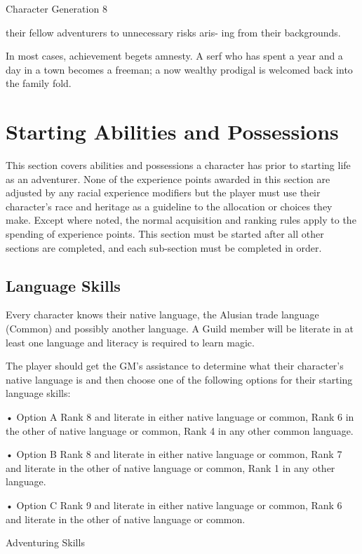 \begin{Chapter}{Character Generation}
8 

their  fellow  adventurers  to  unnecessary  risks  aris-
ing from their backgrounds. 

In most cases, achievement begets amnesty. A serf 
who has spent a year and a day in a town becomes 
a  freeman;  a  now  wealthy  prodigal  is  welcomed 
back into the family fold. 

\section{Starting Abilities and Possessions}

This section covers abilities and possessions a character has prior to
starting life as an adventurer.  None of the experience points awarded
in this section are adjusted by any racial experience modifiers but
the player must use their character’s race and heritage as a guideline
to the allocation or choices they make. Except where noted, the normal
acquisition and ranking rules apply to the spending of experience
points.  This section must be started after all other sections are
completed, and each sub-section must be completed in order.

\subsection{Language Skills}

Every character knows their native language, the Alusian trade
language (Common) and possibly another language. A Guild member will
be literate in at least one language and literacy is required to learn
magic.

The player should get the GM’s assistance to determine what their
character’s native language is and then choose one of the following
options for their starting language skills:

•  Option  A  Rank  8  and  literate  in  either  native 
language or common, Rank 6 in the other of native 
language or common, Rank 4 in any other common 
language. 

•  Option  B  Rank  8  and  literate  in  either  native 
language  or  common,  Rank  7  and  literate  in  the 
other of native language or common, Rank 1 in any 
other language. 

•  Option  C  Rank  9  and  literate  in  either  native 
language  or  common,  Rank  6  and  literate  in  the 
other of native language or common. 

Adventuring Skills 


\end{Chapter}
